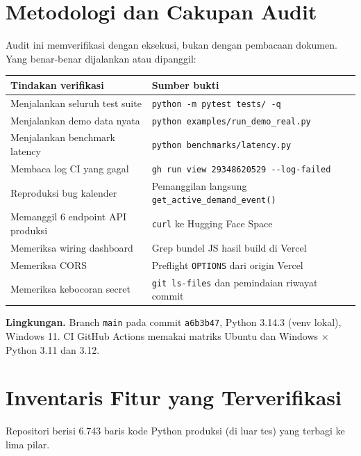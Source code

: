 \documentclass[11pt,a4paper]{article}
\newcommand{\code}[1]{\texttt{\small #1}}
\begin{document}
\section{Metodologi dan Cakupan Audit}

Audit ini memverifikasi dengan eksekusi, bukan dengan pembacaan dokumen. Yang benar-benar
dijalankan atau dipanggil:

\begin{center}
\begin{tabular}{@{}p{6.8cm}p{8.2cm}@{}}
\toprule
\textbf{Tindakan verifikasi} & \textbf{Sumber bukti} \\
\midrule
Menjalankan seluruh test suite & \code{python -m pytest tests/ -q} \\
Menjalankan demo data nyata & \code{python examples/run\_demo\_real.py} \\
Menjalankan benchmark latency & \code{python benchmarks/latency.py} \\
Membaca log CI yang gagal & \code{gh run view 29348620529 -{}-log-failed} \\
Reproduksi bug kalender & Pemanggilan langsung \code{get\_active\_demand\_event()} \\
Memanggil 6 endpoint API produksi & \code{curl} ke Hugging Face Space \\
Memeriksa wiring dashboard & Grep bundel JS hasil build di Vercel \\
Memeriksa CORS & Preflight \code{OPTIONS} dari origin Vercel \\
Memeriksa kebocoran secret & \code{git ls-files} dan pemindaian riwayat commit \\
\bottomrule
\end{tabular}
\end{center}

\noindent
\textbf{Lingkungan.} Branch \code{main} pada commit \code{a6b3b47}, Python 3.14.3 (venv lokal),
Windows 11. CI GitHub Actions memakai matriks Ubuntu dan Windows $\times$ Python 3.11 dan 3.12.

\section{Inventaris Fitur yang Terverifikasi}

Repositori berisi 6.743 baris kode Python produksi (di luar tes) yang terbagi ke lima pilar.
\end{document}
